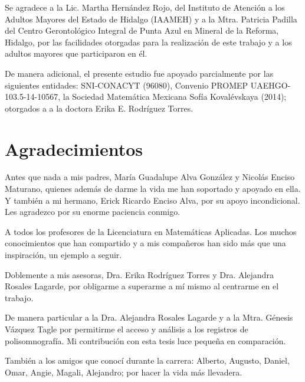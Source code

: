 \documentclass[12pt,letterpaper]{book}
\begin{document}
Se agradece a la Lic. Martha Hernández Rojo, del Instituto de Atención a los Adultos Mayores del Estado de Hidalgo (IAAMEH) y a la Mtra. Patricia Padilla del Centro Gerontológico Integral de Punta Azul en Mineral de la Reforma, Hidalgo, por las facilidades otorgadas para la realización de este trabajo y a los adultos mayores que participaron en él.%

De manera adicional, el presente estudio fue apoyado parcialmente por las siguientes entidades: SNI-CONACYT (96080), Convenio PROMEP UAEHGO-103.5-14-10567, la Sociedad Matemática Mexicana Sofía Kovalévskaya (2014); otorgados a a la doctora Erika E. Rodríguez Torres.

\newpage


\chapter*{Agradecimientos}

Antes que nada a mis padres, María Guadalupe Alva González y Nicolás Enciso Maturano, quienes además de darme la vida me han soportado y apoyado en ella. Y también a mi hermano, Erick Ricardo Enciso Alva, por su apoyo incondicional.
%
Les agradezco por su enorme paciencia conmigo.

A todos los profesores de la Licenciatura en Matemáticas Aplicadas. Los muchos conocimientos que han compartido y a mis compañeros han sido más que una inspiración, un ejemplo a seguir.
%

Doblemente a mis asesoras, Dra. Erika Rodríguez Torres y Dra. Alejandra Rosales Lagarde, por obligarme a superarme a mí mismo al centrarme en el trabajo.

De manera particular a la Dra. Alejandra Rosales Lagarde y a la Mtra. Génesis Vázquez Tagle por permitirme el acceso y análisis a los registros de polisomnografía. Mi contribución con esta tesis luce pequeña en comparación.

También a los amigos que conocí durante la carrera: Alberto, Augusto, Daniel, Omar, Angie, Magali, Alejandro; por hacer la vida más llevadera.
\end{document}
